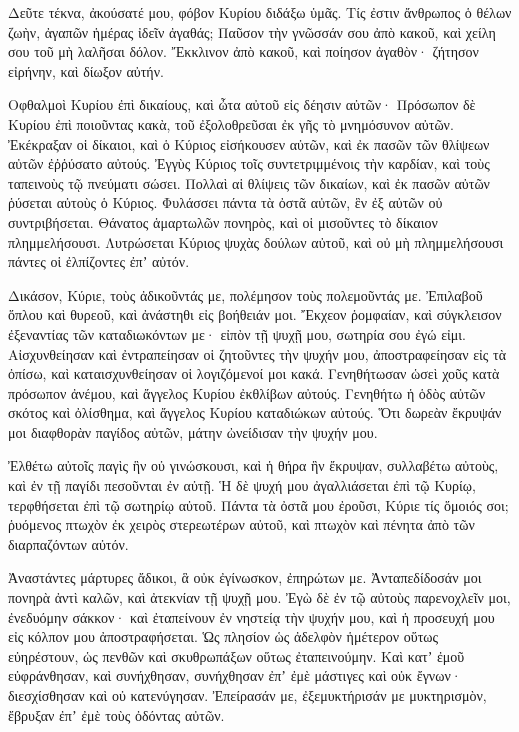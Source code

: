 \begin{spacing}{1.1}
\begin{multicols}{2}
Δεῦτε τέκνα, ἀκούσατέ μου, φόβον Κυρίου διδάξω ὑμᾶς.
Τίς ἐστιν ἄνθρωπος ὁ θέλων ζωὴν, ἀγαπῶν ἡμέρας ἰδεῖν ἀγαθάς;
Παῦσον τὴν γνῶσσάν σου ἀπὸ κακοῦ, καὶ χείλη σου τοῦ μὴ λαλῆσαι δόλον.
Ἔκκλινον ἀπὸ κακοῦ, καὶ ποίησον ἀγαθὸν· ζήτησον εἰρήνην, καὶ δίωξον αὐτήν.

Οφθαλμοὶ Κυρίου ἐπὶ δικαίους, καὶ ὦτα αὐτοῦ εἰς δέησιν αὐτῶν·
Πρόσωπον δὲ Κυρίου ἐπὶ ποιοῦντας κακὰ, τοῦ ἐξολοθρεῦσαι ἐκ γῆς τὸ μνημόσυνον αὐτῶν.
Ἐκέκραξαν οἱ δίκαιοι, καὶ ὁ Κύριος εἰσήκουσεν αὐτῶν, καὶ ἐκ πασῶν τῶν θλίψεων αὐτῶν ἐῤῥύσατο αὐτούς.
Ἐγγὺς Κύριος τοῖς συντετριμμένοις τὴν καρδίαν, καὶ τοὺς ταπεινοὺς τῷ πνεύματι σώσει.
Πολλαὶ αἱ θλίψεις τῶν δικαίων, καὶ ἐκ πασῶν αὐτῶν ῥύσεται αὐτοὺς
ὁ Κύριος. Φυλάσσει πάντα τὰ ὀστᾶ αὐτῶν, ἓν ἐξ αὐτῶν οὐ συντριβήσεται.
Θάνατος ἁμαρτωλῶν πονηρὸς, καὶ οἱ μισοῦντες τὸ δίκαιον πλημμελήσουσι.
Λυτρώσεται Κύριος ψυχὰς δούλων αὐτοῦ, καὶ οὐ μὴ πλημμελήσουσι πάντες οἱ ἐλπίζοντες ἐπʼ αὐτόν.

Δικάσον, Κύριε, τοὺς ἀδικοῦντάς με, πολέμησον τοὺς πολεμοῦντάς με.
Ἐπιλαβοῦ ὅπλου καὶ θυρεοῦ, καὶ ἀνάστηθι εἰς βοήθειάν μοι.
Ἔκχεον ῥομφαίαν, καὶ σύγκλεισον ἐξεναντίας τῶν καταδιωκόντων με· εἰπὸν τῇ ψυχῇ μου, σωτηρία σου ἐγώ εἰμι.
Αἰσχυνθείησαν καὶ ἐντραπείησαν οἱ ζητοῦντες τὴν ψυχήν μου, ἀποστραφείησαν εἰς τὰ ὀπίσω, καὶ καταισχυνθείησαν οἱ λογιζόμενοί μοι κακά.
Γενηθήτωσαν ὡσεὶ χοῦς κατὰ πρόσωπον ἀνέμου, καὶ ἄγγελος Κυρίου ἐκθλίβων αὐτούς.
Γενηθήτω ἡ ὁδὸς αὐτῶν σκότος καὶ ὀλίσθημα, καὶ ἄγγελος Κυρίου καταδιώκων αὐτούς.
Ὅτι δωρεὰν ἔκρυψάν μοι διαφθορὰν παγίδος αὐτῶν, μάτην ὠνείδισαν τὴν ψυχήν μου.

Ἐλθέτω αὐτοῖς παγὶς ἣν οὐ γινώσκουσι, καὶ ἡ θήρα ἣν ἔκρυψαν, συλλαβέτω αὐτοὺς, καὶ ἐν τῇ παγίδι πεσοῦνται ἐν αὐτῇ.
Ἡ δὲ ψυχή μου ἀγαλλιάσεται ἐπὶ τῷ Κυρίῳ, τερφθήσεται ἐπὶ τῷ σωτηρίῳ αὐτοῦ.
Πάντα τὰ ὀστᾶ μου ἐροῦσι, Κύριε τίς ὅμοιός σοι; ῥυόμενος πτωχὸν ἐκ χειρὸς στερεωτέρων αὐτοῦ, καὶ πτωχὸν καὶ πένητα ἀπὸ τῶν διαρπαζόντων αὐτόν.

Ἀναστάντες μάρτυρες ἄδικοι, ἃ οὐκ ἐγίνωσκον, ἐπηρώτων με.
Ἀνταπεδίδοσάν μοι πονηρὰ ἀντὶ καλῶν, καὶ ἀτεκνίαν τῇ ψυχῇ μου.
Ἐγὼ δὲ ἐν τῷ αὐτοὺς παρενοχλεῖν μοι, ἐνεδυόμην σάκκον· καὶ ἐταπείνουν ἐν νηστείᾳ τὴν ψυχήν μου, καὶ ἡ προσευχή μου εἰς κόλπον μου ἀποστραφήσεται.
Ὡς πλησίον ὡς ἀδελφὸν ἡμέτερον οὕτως εὐηρέστουν, ὡς πενθῶν καὶ σκυθρωπάξων οὕτως ἐταπεινούμην.
Καὶ κατʼ ἐμοῦ εὐφράνθησαν, καὶ συνήχθησαν, συνήχθησαν ἐπʼ ἐμὲ μάστιγες καὶ οὐκ ἔγνων· διεσχίσθησαν καὶ οὐ κατενύγησαν.
Ἐπείρασάν με, ἐξεμυκτήρισάν με μυκτηρισμὸν, ἔβρυξαν ἐπʼ ἐμὲ τοὺς ὀδόντας αὐτῶν.


\end{multicols}
\end{spacing}
